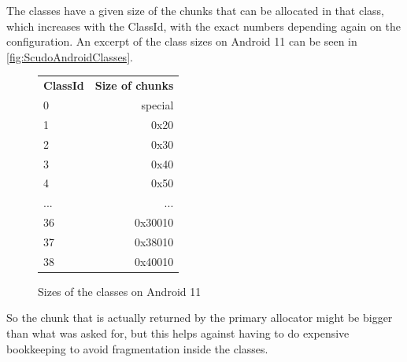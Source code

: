 \documentclass[a4paper,11pt,oneside]{report}
\begin{document}
The classes have a given size of the chunks that can be allocated in that class,
which increases with the ClassId, with the exact numbers depending again on the
configuration. An excerpt of the class sizes on Android 11 can be seen in
\autoref{fig:ScudoAndroidClasses}.

\begin{figure}[h!]
  \centering
  \begin{tabular}{lr}
    \textbf{ClassId} & \textbf{Size of chunks} \\
    0                & special                 \\
    1                & 0x20                    \\
    2                & 0x30                    \\
    3                & 0x40                    \\
    4                & 0x50                    \\
    ...              & ...                     \\
    36               & 0x30010                 \\
    37               & 0x38010                 \\
    38               & 0x40010                
  \end{tabular}
  \caption{Sizes of the classes on Android 11}
  \label{fig:ScudoAndroidClasses}
\end{figure}

So the chunk that is actually returned by the primary allocator might be bigger
than what was asked for, but this helps against having to do expensive bookkeeping
to avoid fragmentation inside the classes.
\end{document}
